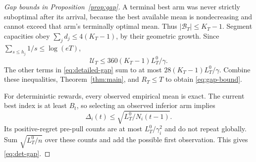 \begin{proof}[Gap bounds in Proposition~\ref{prop:gap}]
A terminal best arm was never strictly suboptimal after its arrival, because the best available mean is nondecreasing and cannot exceed that arm's terminally optimal mean. Thus $|\mathcal B_T|\le K_T-1$. Segment capacities obey $\sum_jd_j\le4(K_T-1)$, by their geometric growth. Since $\sum_{s\le h_j}1/s\le\log(eT)$,
\[
 \mathcal U_T\le360(K_T-1)L_T^0/\gamma.
\]
The other terms in \eqref{eq:detailed-gap} sum to at most $28(K_T-1)L_T^0/\gamma$. Combine these inequalities, Theorem~\ref{thm:main}, and $R_T\le T$ to obtain \eqref{eq:gap-bound}.

For deterministic rewards, every observed empirical mean is exact. The current best index is at least $B_t$, so selecting an observed inferior arm implies
\[
 \Delta_i(t)\le\sqrt{L_T^0/N_i(t-1)}.
\]
Its positive-regret pre-pull counts are at most $L_T^0/\gamma_i^2$ and do not repeat globally. Sum $\sqrt{L_T^0/n}$ over these counts and add the possible first observation. This gives \eqref{eq:det-gap}.
\end{proof}

